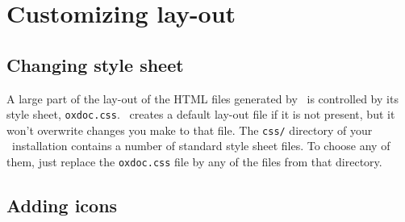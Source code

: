 \chapter{Customizing lay-out}

\section{Changing style sheet}
A large part of the lay-out of the HTML files generated by \oxdoc~is controlled by its
style sheet, {\tt oxdoc.css}. \oxdoc~creates a default
lay-out file if it is not present, but it won't overwrite changes you make
to that file. The {\tt css/} directory of your \oxdoc~installation contains a number of 
standard style sheet files. To choose any of them, just replace the {\tt oxdoc.css} file
by any of the files from that directory. 

\section{Adding icons}


